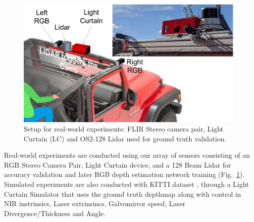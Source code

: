 \begin{figure}[h]
   \centering
   \begin{minipage}{0.4\textwidth}
       \centering
       \includegraphics[width=1.0\textwidth]{figures/array.pdf}
   \end{minipage}\hfill
   \centering
   \caption{Setup for real-world experiments: FLIR Stereo camera pair, Light Curtain (LC) and OS2-128 Lidar used for ground truth validation.}
   \label{fig:sensorarray} 
\end{figure}

Real-world experiments are conducted using our array of sensors consisting of an RGB Stereo Camera Pair, Light Curtain device, and a 128 Beam Lidar for accuracy validation and later RGB depth estimation network training (Fig.~\ref{fig:sensorarray}). Simulated experiments are also conducted with KITTI dataset \cite{Geiger2013IJRR}, through a Light Curtain Simulator that uses the ground truth depthmap along with control in NIR instrinsics, Laser extrinsincs, Galvomirror speed, Laser Divergence/Thickness and Angle. 



